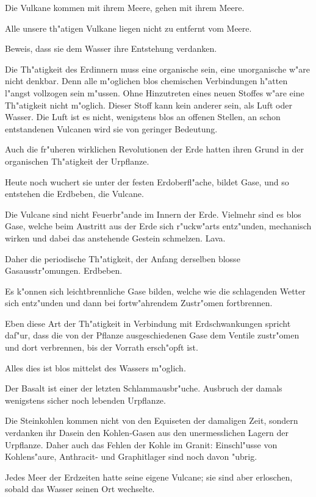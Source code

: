 \documentclass[a4paper, 11pt, oneside, german]{article}
\begin{document}
Die Vulkane kommen mit ihrem Meere, gehen mit ihrem Meere.

Alle unsere th"atigen Vulkane liegen nicht zu entfernt vom Meere.

Beweis, dass sie dem Wasser ihre Entstehung verdanken.

Die Th"atigkeit des Erdinnern muss eine organische sein, eine unorganische w"are nicht denkbar. Denn alle m"oglichen blos chemischen Verbindungen h"atten l"angst vollzogen sein m"ussen. Ohne Hinzutreten eines neuen Stoffes w"are eine Th"atigkeit nicht m"oglich. Dieser Stoff kann kein anderer sein, als Luft oder Wasser. Die Luft ist es nicht, wenigstens blos an offenen Stellen, an schon entstandenen Vulcanen wird sie von geringer Bedeutung.

Auch die fr"uheren wirklichen Revolutionen der Erde hatten ihren Grund in der organischen Th"atigkeit der Urpflanze.

Heute noch wuchert sie unter der festen Erdoberfl"ache, bildet Gase, und so entstehen die Erdbeben, die Vulcane.

Die Vulcane sind nicht Feuerbr"ande im Innern der Erde. Vielmehr sind es blos Gase, welche beim Austritt aus der Erde sich r"uckw"arts entz"unden, mechanisch wirken und dabei das anstehende Gestein schmelzen. Lava.

Daher die periodische Th"atigkeit, der Anfang derselben blosse Gasausstr"omungen. Erdbeben.

Es k"onnen sich leichtbrennliche Gase bilden, welche wie die schlagenden Wetter sich entz"unden und dann bei fortw"ahrendem Zustr"omen fortbrennen.

Eben diese Art der Th"atigkeit in Verbindung mit Erdschwankungen spricht daf"ur, dass die von der Pflanze ausgeschiedenen Gase dem Ventile zustr"omen und dort verbrennen, bis der Vorrath ersch"opft ist.

Alles dies ist blos mittelst des Wassers m"oglich.

Der Basalt ist einer der letzten Schlammausbr"uche. Ausbruch der damals wenigstens sicher noch lebenden Urpflanze.

Die Steinkohlen kommen nicht von den Equiseten der damaligen Zeit, sondern verdanken ihr Dasein den Kohlen-Gasen aus den unermesslichen Lagern der Urpflanze. Daher auch das Fehlen der Kohle im Granit: Einschl"usse von Kohlens"aure, Anthracit- und Graphitlager sind noch davon "ubrig.

Jedes Meer der Erdzeiten hatte seine eigene Vulcane; sie sind aber erloschen, sobald das Wasser seinen Ort wechselte.
\end{document}
